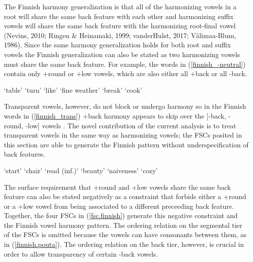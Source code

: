 \documentclass[,doc,floatsintext]{apa6}
\theoremstyle{definition}
\theoremstyle{definition}
\theoremstyle{definition}
\theoremstyle{remark}
\begin{document}
The Finnish harmony generalization is that all of the harmonizing vowels
in a root will share the same back feature with each other and
harmonizing suffix vowels will share the same back feature with the
harmonizing root-final vowel (Nevins, 2010; Ringen \& Heinamaki, 1999;
vanderHulst, 2017; Välimaa-Blum, 1986). Since the same harmony
generalization holds for both root and suffix vowels the Finnish
generalization can also be stated as two harmonizing vowels must share
the same back feature. For example, the words in
(\ref{finnish_-neutral}) contain only +round or +low vowels, which are
also either all +back or all -back.

\begin{exe}
\label{finnish_-neutral}
\begin{xlist}
  \ex {} `table'
  \ex {} `turn'
  \ex {} `like'
  \ex {} `fine weather'
  \ex {} `break'
  \ex {} `cook'
  \end{xlist}
\end{exe}

Transparent vowels, however, do not block or undergo harmony so in the
Finnish words in (\ref{finnish_trans}) +back harmony appears to skip
over the {[}-back, -round, -low{]} vowels \textipa{[i, i:, e, e:]}. The
novel contribution of the current analysis is to treat transparent
vowels in the same way as harmonizing vowels; the FSCs posited in this
section are able to generate the Finnish pattern without
underspecification of back features.

\begin{exe}
\label{finnish_trans}
\begin{xlist}
  \ex {} `start'
  \ex {} `chair'
  \ex {} `read (inf.)'
  \ex {} `beauty'
  \ex {} `naiveness'
  \ex {} `cozy'
  \end{xlist}
\end{exe}

The surface requirement that +round and +low vowels share the same back
feature can also be stated negatively as a constraint that forbids
either a +round or a +low vowel from being associated to a different
preceeding back feature. Together, the four FSCs in (\ref{fsc.finnish})
generate this negative constraint and the Finnish vowel harmony pattern.
The ordering relation on the segmental tier of the FSCs is omitted
because the vowels can have consonants between them, as in
(\ref{finnish.pouta}). The ordering relation on the back tier, however,
is crucial in order to allow transparency of certain -back vowels.
\end{document}
